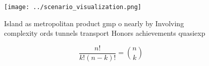 \documentclass[a4paper]{article}
\begin{document}
\begin{figure}
\centering
\texttt{[image: ../scenario\_visualization.png]}
\caption{Island as metropolitan product gmp o nearly by Involving complexity ords tunnels transport Honors achievements quasiexp
}
\end{figure}
 
\[ \frac{n!}{k!(n-k)!} = \binom{n}{k} \]
\end{document}
